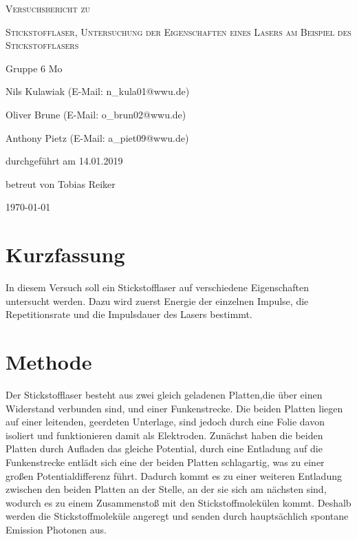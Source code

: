 \documentclass[
	a4paper,
	12pt,
	pagesize,
	ngerman
]{scrartcl}
\begin{document}
\begin{titlepage}
	\centering
	{\scshape\LARGE Versuchsbericht zu \par}
	\vspace{1cm}
	{\scshape\huge Stickstofflaser, Untersuchung der Eigenschaften eines Lasers am Beispiel des Stickstofflasers     \par}
	\vspace{2.5cm}
	{\LARGE Gruppe 6 Mo\par}
	\vspace{0.5cm}
	{\large Nils Kulawiak (E-Mail: n\_kula01@wwu.de) \par}
	{\large Oliver Brune (E-Mail: o\_brun02@wwu.de) \par}
	{\large Anthony Pietz (E-Mail: a\_piet09@wwu.de) \par}
	\vfill
	durchgeführt am 14.01.2019\par
	
	\vfill
	betreut von Tobias Reiker\par
	
	\vfill
	{\large \today\par}
\end{titlepage}

\tableofcontents
\newpage

\section{Kurzfassung}
In diesem Versuch soll ein Stickstofflaser auf verschiedene Eigenschaften untersucht werden. Dazu wird zuerst Energie der einzelnen Impulse, die Repetitionsrate und die Impulsdauer des Lasers bestimmt.


\section{Methode}
Der Stickstofflaser besteht aus zwei gleich geladenen Platten,die über einen Widerstand verbunden sind, und einer Funkenstrecke. Die beiden Platten liegen auf einer leitenden, geerdeten Unterlage, sind jedoch durch eine Folie davon isoliert und funktionieren damit als Elektroden. Zunächst haben die beiden Platten durch Aufladen das gleiche Potential, durch eine Entladung auf die Funkenstrecke entlädt sich eine der beiden Platten schlagartig, was zu einer großen Potentialdifferenz führt. Dadurch kommt es zu einer weiteren Entladung zwischen den beiden Platten an der Stelle, an der sie sich am nächsten sind, wodurch es zu einem Zusammenstoß mit den Stickstoffmolekülen kommt. Deshalb werden die Stickstoffmoleküle angeregt und senden durch hauptsächlich spontane Emission Photonen aus. %
\end{document}
